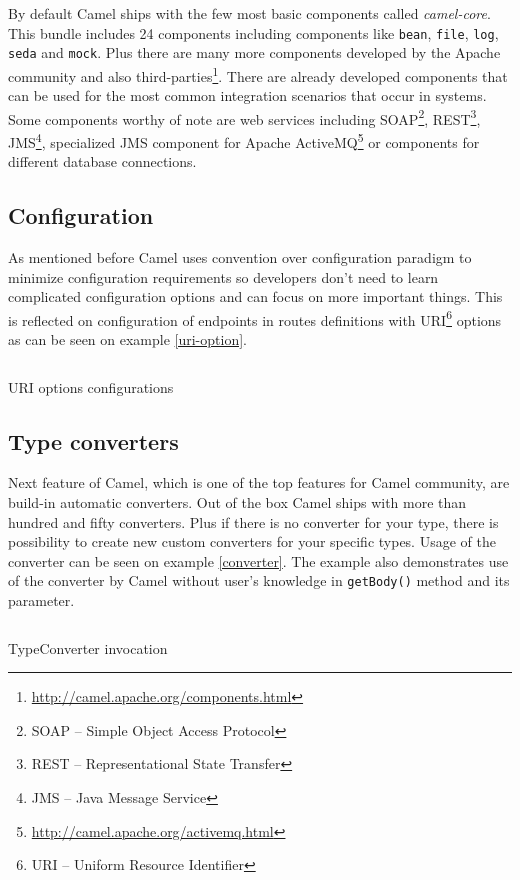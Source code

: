 \documentclass[12pt,final,oneside]{fithesis2}
\begin{document}
By default Camel ships with the few most basic components called \textit{camel-core}. This bundle includes 24 components including components like \texttt{bean}, \texttt{file}, \texttt{log}, \texttt{seda} and \texttt{mock}. Plus there are many more components developed by the Apache community and also third-parties\footnote{\url{http://camel.apache.org/components.html}}. There are already developed components that can be used for the most common integration scenarios that occur in systems. Some components worthy of note are web services including SOAP\footnote{SOAP -- Simple Object Access Protocol}, REST\footnote{REST -- Representational State Transfer}, JMS\footnote{JMS -- Java Message Service}, specialized JMS component for Apache ActiveMQ\footnote{\url{http://camel.apache.org/activemq.html}} or components for different database connections.


\subsection*{Configuration}
As mentioned before Camel uses convention over configuration paradigm to minimize configuration requirements so developers don't need to learn complicated configuration options and can focus on more important things. This is reflected on configuration of endpoints in routes definitions with URI\footnote{URI -- Uniform Resource Identifier} options as can be seen on example \ref{uri-option}.
\begin{listing}[ht]
	\inputminted[]{java}{sources/uri.java}
	\caption{URI options configurations}
	\label{uri-option}
\end{listing}

\subsection*{Type converters}
Next feature of Camel, which is one of the top features for Camel community, are build-in automatic converters. Out of the box Camel ships with more than hundred and fifty converters\cite{camel-in-action}. Plus if there is no converter for your type, there is possibility to create new custom converters for your specific types. Usage of the converter can be seen on example \ref{converter}. The example also demonstrates use of the converter by Camel without user's knowledge in \texttt{getBody()} method and its parameter.

\begin{listing}[ht, p!]
	\inputminted[]{java}{sources/converter.java}
	\caption{TypeConverter invocation}
	\label{converter}
\end{listing}
\end{document}
